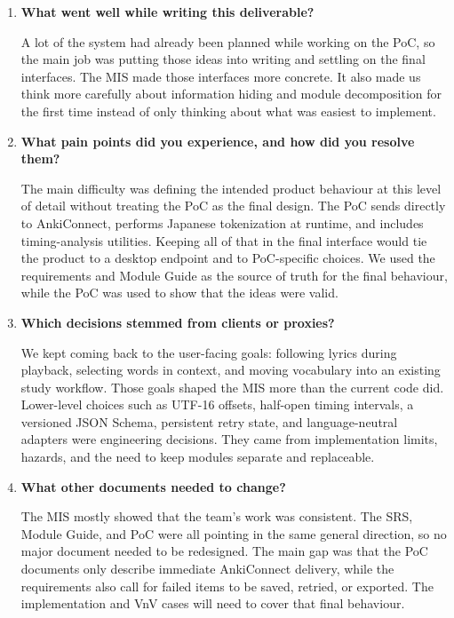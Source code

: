 \documentclass[12pt, titlepage]{article}
\begin{document}
\begin{enumerate}
  \item \textbf{What went well while writing this deliverable?}

  A lot of the system had already been planned while working on the PoC, so the
  main job was putting those ideas into writing and settling on the final
  interfaces.  The MIS made those interfaces more concrete.  It also made us
  think more carefully about information hiding and module decomposition for
  the first time instead of only thinking about what was easiest to implement.

  \item \textbf{What pain points did you experience, and how did you resolve
  them?}

  The main difficulty was defining the intended product behaviour at this level
  of detail without treating the PoC as the final design.  The PoC sends
  directly to AnkiConnect, performs Japanese tokenization at runtime, and
  includes timing-analysis utilities.  Keeping all of that in the final
  interface would tie the product to a desktop endpoint and to PoC-specific
  choices.  We used the requirements and Module Guide as the source of truth
  for the final behaviour, while the PoC was used to show that the ideas were
  valid.

  \item \textbf{Which decisions stemmed from clients or proxies?}

  We kept coming back to the user-facing goals: following lyrics during
  playback, selecting words in context, and moving vocabulary into an existing
  study workflow.  Those goals shaped the MIS more than the current code did.
  Lower-level choices such as UTF-16 offsets, half-open timing intervals, a
  versioned JSON Schema, persistent retry state, and language-neutral adapters
  were engineering decisions.  They came from implementation limits, hazards,
  and the need to keep modules separate and replaceable.

  \item \textbf{What other documents needed to change?}

  The MIS mostly showed that the team's work was consistent.  The SRS, Module
  Guide, and PoC were all pointing in the same general direction, so no major
  document needed to be redesigned.  The main gap was that the PoC documents
  only describe immediate AnkiConnect delivery, while the requirements also
  call for failed items to be saved, retried, or exported.  The implementation
  and VnV cases will need to cover that final behaviour.


\end{enumerate}
\end{document}
